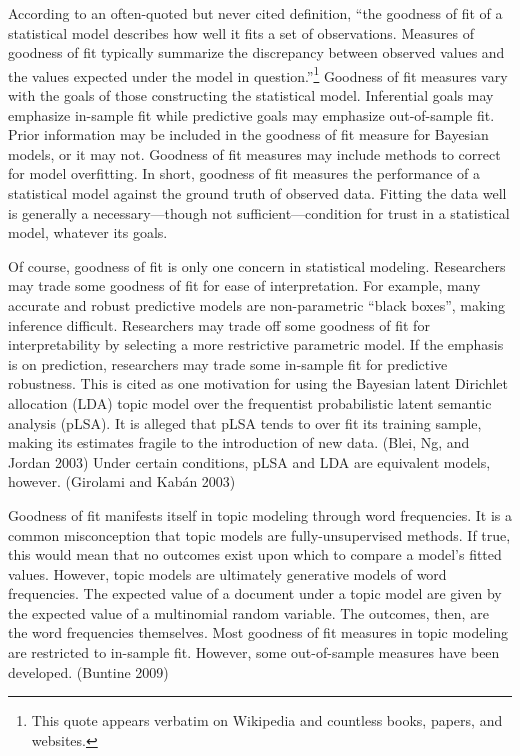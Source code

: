 \documentclass[conference,final,]{IEEEtran}
\begin{document}
According to an often-quoted but never cited definition, ``the goodness
of fit of a statistical model describes how well it fits a set of
observations. Measures of goodness of fit typically summarize the
discrepancy between observed values and the values expected under the
model in question.''\footnote{This quote appears verbatim on Wikipedia
  and countless books, papers, and websites.} Goodness of fit measures
vary with the goals of those constructing the statistical model.
Inferential goals may emphasize in-sample fit while predictive goals may
emphasize out-of-sample fit. Prior information may be included in the
goodness of fit measure for Bayesian models, or it may not. Goodness of
fit measures may include methods to correct for model overfitting. In
short, goodness of fit measures the performance of a statistical model
against the ground truth of observed data. Fitting the data well is
generally a necessary---though not sufficient---condition for trust in a
statistical model, whatever its goals.

Of course, goodness of fit is only one concern in statistical modeling.
Researchers may trade some goodness of fit for ease of interpretation.
For example, many accurate and robust predictive models are
non-parametric ``black boxes'', making inference difficult. Researchers
may trade off some goodness of fit for interpretability by selecting a
more restrictive parametric model. If the emphasis is on prediction,
researchers may trade some in-sample fit for predictive robustness. This
is cited as one motivation for using the Bayesian latent Dirichlet
allocation (LDA) topic model over the frequentist probabilistic latent
semantic analysis (pLSA). It is alleged that pLSA tends to over fit its
training sample, making its estimates fragile to the introduction of new
data. (Blei, Ng, and Jordan 2003) Under certain conditions, pLSA and LDA
are equivalent models, however. (Girolami and Kabán 2003)

Goodness of fit manifests itself in topic modeling through word
frequencies. It is a common misconception that topic models are
fully-unsupervised methods. If true, this would mean that no outcomes
exist upon which to compare a model's fitted values. However, topic
models are ultimately generative models of word frequencies. The
expected value of a document under a topic model are given by the
expected value of a multinomial random variable. The outcomes, then, are
the word frequencies themselves. Most goodness of fit measures in topic
modeling are restricted to in-sample fit. However, some out-of-sample
measures have been developed. (Buntine 2009)
\end{document}
